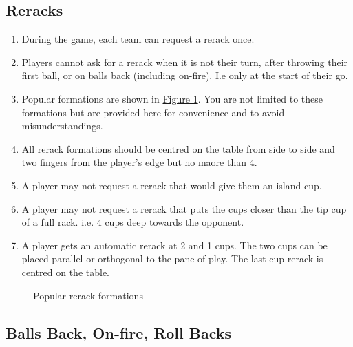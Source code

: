 	\subsection{Reracks}\label{ssec:Rerack}
		\begin{enumerate}[label=(\roman*), ref=\roman*]
            \item \label{itm:Rerack,number} During the game, each team can request a rerack once.
            \item \label{itm:Rerack,notallowed} Players cannot ask for a rerack when it is not their turn, after throwing their first ball, or on balls back (including on-fire).
                I.e only at the start of their go.
            \item \label{itm:Rerack,pop_forms} Popular formations are shown in \hyperref[fig:rerack_forms]{Figure \ref*{fig:rerack_forms}}.
                You are not limited to these formations but are provided here for convenience and to avoid misunderstandings. 
            \item \label{itm:Rerack,centering} All rerack formations should be centred on the table from side to side and two fingers from the player's edge but no maore than 4.
            \item \label{itm:Rerack,Island} A player may not request a rerack that would give them an island cup.
            \item \label{itm:Rerack,4cupdeep} A player may not request a rerack that puts the cups closer than the tip cup of a full rack.
                i.e. 4 cups deep towards the opponent.
            \item \label{itm:Rerack,autoreracks} A player gets an automatic rerack at 2 and 1 cups.
                The two cups can be placed parallel or orthogonal to the pane of play.
                The last cup rerack is centred on the table.
        \end{enumerate}
        \begin{figure}[H]
            \centering
            \def\svgwidth{0.8\columnwidth}
            
            \caption{Popular rerack formations}
            \label{fig:rerack_forms}
        \end{figure}
	\subsection{Balls Back, On-fire, Roll Backs}\label{ssec:BallsBack}
